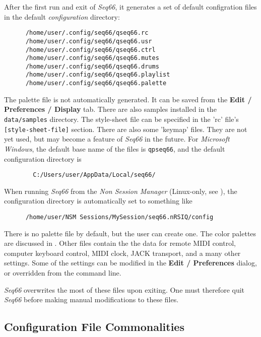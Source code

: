    After the first run and exit of \textsl{Seq66},
   it generates a set of default configration files in the default
   \textsl{configuration} directory:

   \begin{verbatim}
      /home/user/.config/seq66/qseq66.rc
      /home/user/.config/seq66/qseq66.usr
      /home/user/.config/seq66/qseq66.ctrl
      /home/user/.config/seq66/qseq66.mutes
      /home/user/.config/seq66/qseq66.drums
      /home/user/.config/seq66/qseq66.playlist
      /home/user/.config/seq66/qseq66.palette
   \end{verbatim}

   The palette file is not automatically generated.  It can be saved from the
   \textbf{Edit / Preferences / Display} tab.
   There are also samples installed in the \texttt{data/samples}
   directory.
   The style-sheet file can be specified in the 'rc' file's
   \texttt{[style-sheet-file]} section.
   There are also some 'keymap' files.  They are not yet used, but may become a
   feature of \textsl{Seq66} in the future.
   For \textsl{Microsoft Windows}, the default base name of the files is
   \texttt{qpseq66}, and the default configuration directory is

   \begin{verbatim}
        C:/Users/user/AppData/Local/seq66/
   \end{verbatim}

   When running \textsl{Seq66} from the \textsl{Non Session Manager}
   (Linux-only, see ),
   the configuration directory is automatically set to something like

   \begin{verbatim}
      /home/user/NSM Sessions/MySession/seq66.nRSIQ/config
   \end{verbatim}

   There is no palette file by default, but the user can create one.
   The color palettes are discussed in .
   Other files contain the the data for remote MIDI control, computer keyboard
   control, MIDI clock, JACK transport, and a many other settings.
   Some of the settings can be modified in the \textbf{Edit / Preferences}
   dialog, or overridden from the command line.

   \textsl{Seq66} overwrites the most of these files upon exiting.
   One must therefore quit \textsl{Seq66} before making
   manual modifications to these files.

\subsection{Configuration File Commonalities}
\label{subsec:configuration_file_commonalities}

